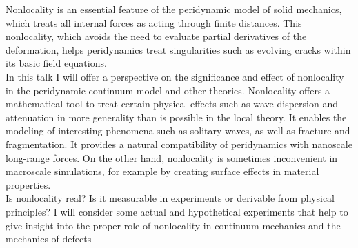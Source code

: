 Nonlocality is an essential feature of the peridynamic model of solid mechanics, which treats all internal forces as acting through finite distances. This nonlocality, which avoids the need to evaluate partial derivatives of the deformation, helps peridynamics treat singularities such as evolving cracks within its basic field equations.\\

In this talk I will offer a perspective on the significance and effect of nonlocality in the peridynamic continuum model and other theories. Nonlocality offers a mathematical tool to treat certain physical effects such as wave dispersion and attenuation in more generality than is possible in the local theory. It enables the modeling of interesting phenomena such as solitary waves, as well as fracture and fragmentation. It provides a natural compatibility of peridynamics with nanoscale long-range forces. On the other hand, nonlocality is sometimes inconvenient in macroscale simulations, for example by creating surface effects in material properties.\\

Is nonlocality real? Is it measurable in experiments or derivable from physical principles? I will consider some actual and hypothetical experiments that help to give insight into the proper role of nonlocality in continuum mechanics and the mechanics of defects